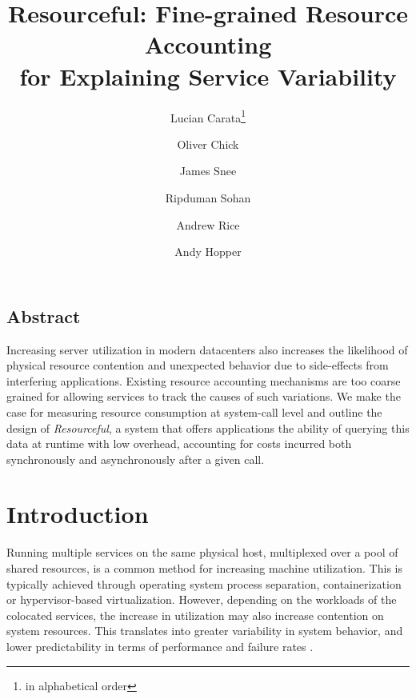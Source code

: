 \documentclass[letterpaper,twocolumn,10pt]{article}
\newcommand{\pname}{Resourceful}
\newcommand*\aorder[1][\value{footnote}]{\footnotemark[#1]}
\begin{document}
\date{}

\title{\Large \bf \pname: Fine-grained Resource Accounting\\for Explaining Service Variability}

\author{Lucian Carata\thanks{in alphabetical order}\aorder} \author{Oliver
Chick\aorder} \author{James Snee\aorder} \author{\authorcr{}Ripduman Sohan}
\author{Andrew Rice} \author{Andy Hopper} 

\maketitle

\thispagestyle{empty}


\subsection*{Abstract}
Increasing server utilization in modern datacenters also increases the
likelihood of physical resource contention and unexpected behavior due to
side-effects from interfering applications. Existing resource accounting
mechanisms are too coarse grained for allowing services to track the causes of
such variations. We make the case for measuring resource consumption at
system-call level and outline the design of \emph{Resourceful}, a system that
offers applications the ability of querying this data at runtime with low
overhead, accounting for costs incurred both synchronously and asynchronously
after a given call.

\section{Introduction} 
Running multiple services on the same physical host, multiplexed over a pool of
shared resources, is a common method for increasing machine utilization. This is
typically achieved through operating system process separation, containerization
or hypervisor-based virtualization. However, depending on the workloads
of the colocated services, the increase in utilization may also increase
contention on system resources. This translates into greater variability in
system behavior, and lower predictability in terms of performance and failure
rates \cite{dean2013}.
\end{document}
